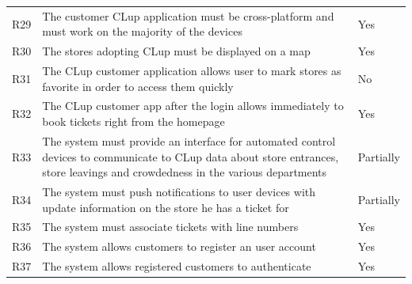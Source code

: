 \begin{tabular}{C{1cm}L{11cm}C{3.1cm}}
    R29   & The customer CLup application must be cross-platform and must work on the majority of the devices                                                                               & Yes          \\
    R30   & The stores adopting CLup must be displayed on a map                                                                                                                             & Yes          \\
    R31   & The CLup customer application allows user to mark stores as favorite in order to access them quickly                                                                             & No              \\
    R32   & The CLup customer app after the login allows immediately to book tickets right from the homepage                                                                                & Yes          \\
    R33   & The system must provide an interface for automated control devices to communicate to CLup data about store entrances, store leavings and crowdedness in the various departments & Partially    \\
    R34   & The system must push notifications to user devices with update information on the store he has a ticket for                                                                     & Partially    \\
    R35   & The system must associate tickets with line numbers                                                                                                                            & Yes          \\
    R36   & The system allows customers to register an user account                                                                                                                          & Yes          \\
    R37   & The system allows registered customers to authenticate                                                                                                                         & Yes          \\
\end{tabular}
\vfill
